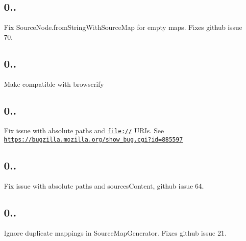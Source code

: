 \subsection*{0..}


\begin{DoxyItemize}
\item Fix Source\+Node.\+from\+String\+With\+Source\+Map for empty maps. Fixes github issue 70.
\end{DoxyItemize}

\subsection*{0..}


\begin{DoxyItemize}
\item Make compatible with browserify
\end{DoxyItemize}

\subsection*{0..}


\begin{DoxyItemize}
\item Fix issue with absolute paths and {\ttfamily \href{file://}{\tt file\+://}} U\+R\+Is. See \href{https://bugzilla.mozilla.org/show_bug.cgi?id=885597}{\tt https\+://bugzilla.\+mozilla.\+org/show\+\_\+bug.\+cgi?id=885597}
\end{DoxyItemize}

\subsection*{0..}


\begin{DoxyItemize}
\item Fix issue with absolute paths and sources\+Content, github issue 64.
\end{DoxyItemize}

\subsection*{0..}


\begin{DoxyItemize}
\item Ignore duplicate mappings in Source\+Map\+Generator. Fixes github issue 21.
\end{DoxyItemize}

